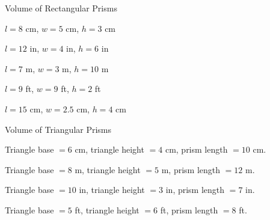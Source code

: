 \begin{practiceBox}{Volume of Rectangular Prisms}


\prob $l = 8$ cm, $w = 5$ cm, $h = 3$ cm \answerBlank[3cm]

\prob $l = 12$ in, $w = 4$ in, $h = 6$ in \answerBlank[3cm]

\prob $l = 7$ m, $w = 3$ m, $h = 10$ m \answerBlank[3cm]

\prob $l = 9$ ft, $w = 9$ ft, $h = 2$ ft \answerBlank[3cm]

\prob $l = 15$ cm, $w = 2.5$ cm, $h = 4$ cm \answerBlank[3cm]

\end{practiceBox}

\begin{practiceBox}[funTeal]{Volume of Triangular Prisms}


\prob Triangle base $= 6$ cm, triangle height $= 4$ cm, prism length $= 10$ cm. \answerBlank[3cm]

\prob Triangle base $= 8$ m, triangle height $= 5$ m, prism length $= 12$ m. \answerBlank[3cm]

\prob Triangle base $= 10$ in, triangle height $= 3$ in, prism length $= 7$ in. \answerBlank[3cm]

\prob Triangle base $= 5$ ft, triangle height $= 6$ ft, prism length $= 8$ ft. \answerBlank[3cm]

\end{practiceBox}

